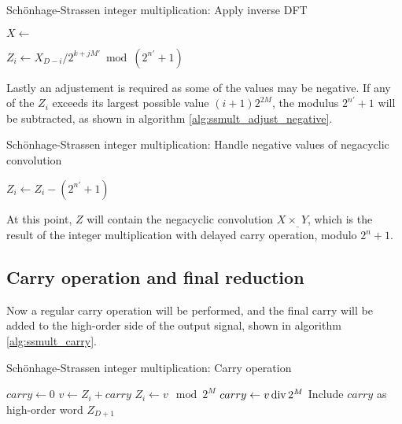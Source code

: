 \begin{algorithm}
		\caption{Schönhage-Strassen integer multiplication: Apply inverse DFT}
		\begin{algorithmic}[1]
				\State $X \gets$ 

				\State $Z_i \gets X_{D - i} / 2^{k + jM'} \bmod (2^{n'} + 1)$
		\end{algorithmic}
		\label{alg:ssmult_inverse_dft}
\end{algorithm}

Lastly an adjustement is required as some of the values may be negative. If any
of the $Z_i$ exceeds its largest possible value $(i + 1) 2^{2M}$, the modulus
$2^{n'} + 1$ will be subtracted, as shown in algorithm
\ref{alg:ssmult_adjust_negative}.

\begin{algorithm}
		\caption{Schönhage-Strassen integer multiplication: Handle negative values of negacyclic convolution}
		\begin{algorithmic}[1]
				\State $Z_i \gets Z_i - (2^{n'} + 1)$
				\EndIf
				\EndFor
		\end{algorithmic}
		\label{alg:ssmult_adjust_negative}
\end{algorithm}

At this point, $Z$ will contain the negacyclic convolution $X \times_{\_} Y$,
which is the result of the integer multiplication with delayed carry operation,
modulo $2^{n} + 1$.

\subsection{Carry operation and final reduction}

Now a regular carry operation will be performed, and the final carry will be
added to the high-order side of the output signal, shown in algorithm
\ref{alg:ssmult_carry}.

\begin{algorithm}
		\caption{Schönhage-Strassen integer multiplication: Carry operation}
		\begin{algorithmic}[1]
				\State $carry \gets 0$
				\State $v \gets Z_i + carry$
				\State $Z_i \gets v \mod 2^M$
				\State $carry \gets v \operatorname{div} 2^M$
				\EndFor
				\State Include $carry$ as high-order word $Z_{D+1}$
				\EndIf
		\end{algorithmic}
		\label{alg:ssmult_carry}
\end{algorithm}

